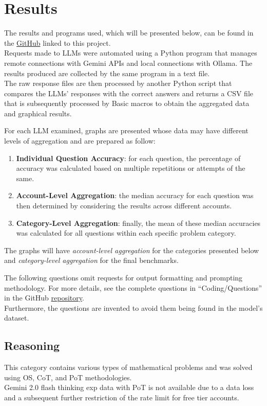 \documentclass[12pt]{article}
\begin{document}
\clearpage
\section{Results}

The results and programs used, which will be presented below, can be found in the \href{https://github.com/PieBerto/Stress-testing-chatbots}{GitHub} linked to this project. \\
Requests made to LLMs were automated using a Python program that manages remote connections with Gemini APIs and local connections with Ollama. The results produced are collected by the same program in a text file.\\
The raw response files are then processed by another Python script that compares the LLMs' responses with the correct answers and returns a CSV file that is subsequently processed by Basic macros to obtain the aggregated data and graphical results.

For each LLM examined, graphs are presented whose data may have different levels of aggregation and are prepared as follow:
\begin{enumerate}
\item \textbf{Individual Question Accuracy}: for each question, the percentage of accuracy was calculated based on multiple repetitions or attempts of the same.
\item \textbf{Account-Level Aggregation}: the median accuracy for each question was then determined by considering the results across different accounts.
\item \textbf{Category-Level Aggregation}: finally, the mean of these median accuracies was calculated for all questions within each specific problem category.
\end{enumerate}
The graphs will have \textit{account-level aggregation} for the categories presented below and \textit{category-level aggregation} for the final benchmarks.

The following questions omit requests for output formatting and prompting methodology. For more details, see the complete questions in “Coding/Questions” in the GitHub \href{https://github.com/PieBerto/Stress-testing-chatbots}{repository}.\\
Furthermore, the questions are invented to avoid them being found in the model's dataset.\\

\subsection{Reasoning}
This category contains various types of mathematical problems and was solved using OS, CoT, and PoT methodologies.\\
Gemini 2.0 flash thinking exp data with PoT is not available due to a data loss and a subsequent further restriction of the rate limit for free tier accounts.\\
\end{document}
